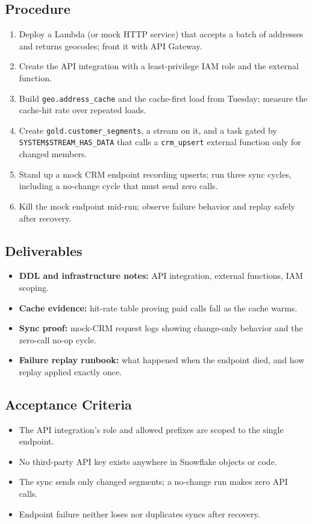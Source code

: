\subsection*{Procedure}
\begin{enumerate}
    \item Deploy a Lambda (or mock HTTP service) that accepts a batch of addresses and returns geocodes; front it with API Gateway.
    \item Create the API integration with a least-privilege IAM role and the external function.
    \item Build \texttt{geo.address\_cache} and the cache-first load from Tuesday; measure the cache-hit rate over repeated loads.
    \item Create \texttt{gold.customer\_segments}, a stream on it, and a task gated by \texttt{SYSTEM\$STREAM\_HAS\_DATA} that calls a \texttt{crm\_upsert} external function only for changed members.
    \item Stand up a mock CRM endpoint recording upserts; run three sync cycles, including a no-change cycle that must send zero calls.
    \item Kill the mock endpoint mid-run; observe failure behavior and replay safely after recovery.
\end{enumerate}

\subsection*{Deliverables}
\begin{itemize}
    \item \textbf{DDL and infrastructure notes:} API integration, external functions, IAM scoping.
    \item \textbf{Cache evidence:} hit-rate table proving paid calls fall as the cache warms.
    \item \textbf{Sync proof:} mock-CRM request logs showing change-only behavior and the zero-call no-op cycle.
    \item \textbf{Failure replay runbook:} what happened when the endpoint died, and how replay applied exactly once.
\end{itemize}

\subsection*{Acceptance Criteria}
\begin{itemize}
    \item The API integration's role and allowed prefixes are scoped to the single endpoint.
    \item No third-party API key exists anywhere in Snowflake objects or code.
    \item The sync sends only changed segments; a no-change run makes zero API calls.
    \item Endpoint failure neither loses nor duplicates syncs after recovery.
\end{itemize}

